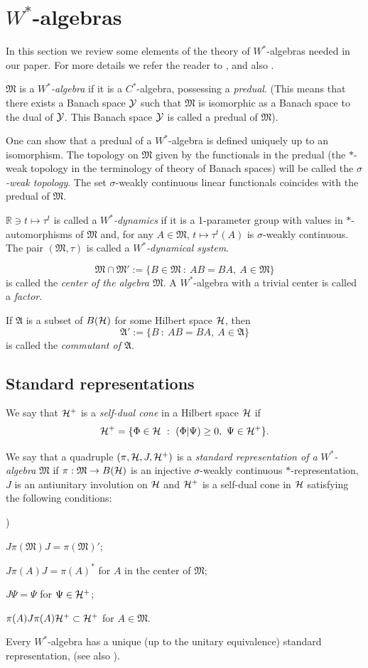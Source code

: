 \documentclass{svmult}
\newcounter{smallarabics}
\newenvironment{arabicenumerate}
{\begin{list}{{\normalfont\textrm{\arabic{smallarabics})}}}
  {\usecounter{smallarabics}\setlength{\itemindent}{0cm}
   \setlength{\leftmargin}{5ex}\setlength{\labelwidth}{4ex}
   \setlength{\topsep}{0.75\parsep}\setlength{\partopsep}{0ex}
   \setlength{\itemsep}{0ex}}}
{\end{list}}
\newcommand{\ben}{\begin{arabicenumerate}}
\newcommand{\een}{\end{arabicenumerate}}
\def\rr{{\mathbb R}}
\def\cY{{\cal Y}}
\def\cB{{ B}}
\def\fM{{\mathfrak M}}
\def\fA{{\mathfrak A}}
\def\cH{{\cal H}}
\def\cH{{\cal H}}
\begin{document}
\section{$W^*$-algebras}     

In this section we review some elements of the theory of
$W^*$-algebras needed in our paper. For more details we refer the
reader to \cite{DJP}, and also  \cite{BR1, BR2, St,Ta1,Ta2}. 




$\fM$ is a
 {\em $W^*$-algebra}
 if it is a $C^*$-algebra, possessing a {\em predual}. (This means
 that there exists a Banach space $\cY$ such that $\fM$ is isomorphic as a
 Banach  space to the dual of $\cY$. This Banach space $\cY$ is called a
 predual of $\fM$).

One can show that a  predual of a $W^*$-algebra
 is defined uniquely up to an isomorphism.
The topology on $\fM$ 
given by the functionals in the predual (the $*$-weak topology in
the terminology of theory of Banach spaces) will be called the {\em 
$\sigma$-weak
topology}. The set $\sigma$-weakly continuous linear functionals coincides with
 the predual of $\fM$.




$\rr\ni t\mapsto \tau^t$ is called
a {\em  $W^*$-dynamics} if it is a 1-parameter group with values in
$*$-automorphisms of $\fM$ and,
 for any $A\in\fM$,
$t\mapsto\tau^t(A)$ is $\sigma$-weakly continuous.
The pair $(\fM,\tau)$ is called a {\em $W^*$-dynamical system}.

\[
\fM\cap\fM':=\{B\in\fM\ :\ AB=BA,\ A\in\fM\}\]
 is called the {\em center of the algebra $\fM$}.
A $W^*$-algebra with a trivial center is called a {\em factor}.

If $\fA$ is a subset of $B(\cH)$ for some Hilbert space $\cH$, then
\[\fA':=\{B\ :\ AB=BA,\ A\in\fA\}\]
is called the {\em commutant of $\fA$}. 



\subsection{Standard representations}


We say that $\cH^+$ is a {\em self-dual cone} in a Hilbert space $\cH$ if
\[\cH^+=\{\Phi\in\cH\ :\ (\Phi|\Psi)\geq0,\ \Psi\in\cH^+\}.\]

 We say that 
 a quadruple $(\pi,\cH,J,\cH^+)$ is a {\em standard representation of a
$W^*$-algebra} $\fM$ if $\pi:\fM\to \cB(\cH)$ is an injective
 $\sigma$-weakly continuous
 $*$-representation, $J$ is an antiunitary involution on $\cH$ and
 $\cH^+$ is a self-dual cone in $\cH$ satisfying the following
conditions:
\ben\item $J\pi(\fM) J=\pi(\fM)'$;
 \item $J\pi(A)J=\pi(A)^*$ for $A$ in the center
 of $\fM$;
\item $J\Psi=\Psi$ for $\Psi\in\cH^+$;
 \item $\pi(A)J\pi(A)\cH^+\subset\cH^+$ for $A\in\fM$.
\een Every $W^*$-algebra has  a unique (up to the unitary 
equivalence) standard representation,  \cite{Ha}
(see also \cite{Ar2, BR2, Co, DJP,Ta2}).
\end{document}
